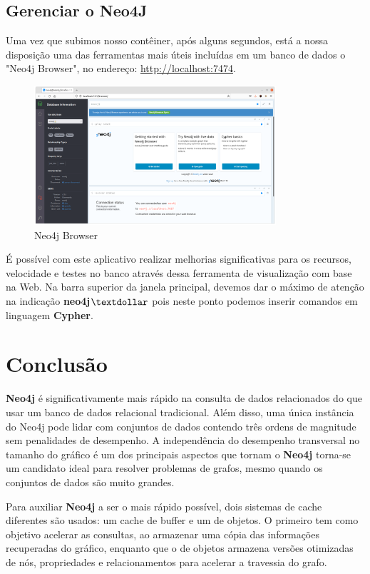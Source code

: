 \documentclass[a4paper,11pt]{article}
\begin{document}
\subsection{Gerenciar o Neo4J}
Uma vez que subimos nosso contêiner, após alguns segundos, está a nossa disposição uma das ferramentas mais úteis incluídas em um banco de dados o "Neo4j Browser", no endereço: \url{http://localhost:7474}.
\begin{figure}[H]
	\centering
	\includegraphics[width=0.8\textwidth]{imagens/browser}
	\caption{Neo4j Browser}
\end{figure}

É possível com este aplicativo realizar melhorias significativas para os recursos, velocidade e testes no banco através dessa ferramenta de visualização com base na Web. Na barra superior da janela principal, devemos dar o máximo de atenção na indicação \textbf{neo4j$\textdollar$ }pois neste ponto podemos inserir comandos em linguagem \textbf{Cypher}.


% 
% 

\section{Conclusão}
\textbf{Neo4j} é significativamente mais rápido na consulta de dados relacionados do que usar um banco de dados relacional tradicional. Além disso, uma única instância do Neo4j pode lidar com conjuntos de dados contendo três ordens de magnitude sem penalidades de desempenho. A independência do desempenho transversal no tamanho do gráfico é um dos principais aspectos que tornam o \textbf{Neo4j} torna-se um candidato ideal para resolver problemas de grafos, mesmo quando os conjuntos de dados são muito grandes.

Para auxiliar \textbf{Neo4j} a ser o mais rápido possível, dois sistemas de cache diferentes são usados: um cache de buffer e um de objetos. O primeiro tem como objetivo acelerar as consultas, ao armazenar uma cópia das informações recuperadas do gráfico, enquanto que o de objetos armazena versões otimizadas de nós, propriedades e relacionamentos para acelerar a travessia do grafo.
\end{document}
